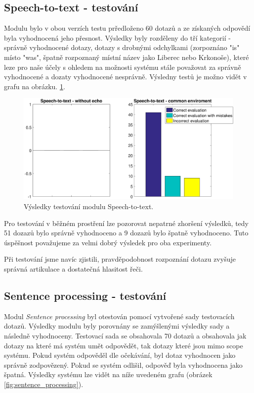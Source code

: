 \documentclass[12pt,a4paper]{article}
\begin{document}
\subsection{Speech-to-text - testování}
Modulu bylo v obou verzích testu prředloženo 60 dotazů a ze získaných odpovědí byla vyhodnocená jeho přesnost. Výsledky byly rozděleny do tří kategorií - správně vyhodnocené dotazy, dotazy s drobnými odchylkami (zorpoznáno "is" místo "was", špatně rozpoznaný místní název jako Liberec nebo Krkonoše), které leze pro naše účely s ohledem na možnosti systému stále považovat za správně vyhodnocené a dozaty vyhodnocené nesprávně.
Výsledny testů je možno vidět v grafu na obrázku.
 \ref*{fig:speech}.
\begin{figure}[ht]
	\begin{center}
		\includegraphics[width = 1\textwidth ]{stt.eps}
		\caption{Výsledky testování modulu Speech-to-text.}
		\label{fig:speech}
	\end{center}
\end{figure}


Pro testování v běžném prostření lze pozorovat nepatrné zhoršení výsledků, tedy 51 dozazů bylo správně vyhodnoceno a 9 dozazů bylo špatně vyhodnoceno. 
Tuto úspěšnost považujeme za velmi dobrý výsledek pro oba experimenty.

Při testování jsme navíc zjistili, pravděpodobnost rozpoznání dotazu zvyšuje správná artikulace a dostatečná hlasitost řeči. 

\subsection{Sentence processing - testování}
Modul \textit{Sentence processing} byl otestován pomocí vytvořené sady testovacích dotazů. Výsledky modulu byly porovnány se zamýšlenými výsledky sady a následně vyhodnoceny.
Testovací sada se obsahovala 70 dotazů a obsahovala jak dotazy na které má systém umět odpovědět, tak dotazy které jsou mimo scope systému. Pokud systém odpověděl dle očekávání, byl dotaz vyhodnocen jako správně zodpovězený. Pokud se systém odlišil, odpověď byla vyhodnocena jako špatná. Výsledky systému lze vidět na níže uvedeném grafu (obrázek \ref*{fig:sentence_processing}).
\end{document}
